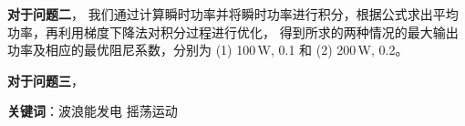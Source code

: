\textbf{对于问题二}，
我们通过计算瞬时功率并将瞬时功率进行积分，根据公式求出平均功率，再利用梯度下降法对积分过程进行优化，
得到所求的两种情况的最大输出功率及相应的最优阻尼系数，分别为 (1) 100\,W, 0.1 和 (2) 200\,W, 0.2。

\textbf{对于问题三}，

\vfill

\textbf{关键词}：波浪能发电 \hspace{1em} 摇荡运动 \hspace{1em}